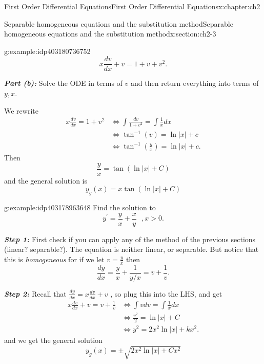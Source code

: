 \documentclass[oneside,10pt,]{book}
\newcommand{\alert}[1]{\textbf{\textit{#1}}}
\numberwithin{equation}{section}
\numberwithin{equation}{section}
\newcommand{\amp}{&}
\begin{document}
\begin{chapterptx}{First Order Differential Equations}{}{First Order Differential Equations}{}{}{x:chapter:ch2}
\begin{sectionptx}{Separable homogeneous equations and the substitution method}{}{Separable homogeneous equations and the substitution method}{}{}{x:section:ch2-3}
\begin{example}{}{g:example:idp403180736752}
\begin{equation*}
x\frac{dv}{dx}+v=1+v+v^{2}.
\end{equation*}
%
\par
\alert{Part (b):} Solve the ODE in terms of \(v\) and then return everything into terms of \(y,x\).%
\par
We rewrite%
\begin{align*}
x\frac{dv}{dx}=1+v^{2} \amp \iff\int\frac{dv}{1+v^{2}}=\int\frac{1}{x}dx\\
\amp \iff\tan^{-1}\left(v\right)=\ln\left|x\right|+c\\
\amp \iff\tan^{-1}\left(\frac{y}{x}\right)=\ln\left|x\right|+c.
\end{align*}
Then%
\begin{equation*}
\frac{y}{x}=\tan\left(\ln\left|x\right|+C\right)
\end{equation*}
and the general solution is%
\begin{equation*}
y_g(x)=x\tan\left(\ln\left|x\right|+C\right)
\end{equation*}
%
\end{example}
\begin{example}{}{g:example:idp403178963648}%
Find the solution to%
\begin{equation*}
y^{\prime}=\frac{y}{x}+\frac{x}{y}\,\,\,\,,x>0.
\end{equation*}
%
\par
\alert{Step 1:} First check if you can apply any of the method of the previous sections (linear? separable?). The equation is neither linear, or separable. But notice that this is \emph{homogeneous} for if we let \(v=\frac{y}{x}\) then%
\begin{equation*}
\frac{dy}{dx}=\frac{y}{x}+\frac{1}{y/x}=v+\frac{1}{v}.
\end{equation*}
%
\par
\alert{Step 2:} Recall that \(\frac{dy}{dx}=x\frac{dv}{dx}+v\) , so plug this into the LHS, and get%
\begin{align*}
x\frac{dv}{dx}+v=v+\frac{1}{v} \amp \iff\int vdv=\int\frac{1}{x}dx\\
\amp \iff\frac{v^{2}}{2}=\ln\left|x\right|+C\\
\amp \iff y^{2}=2x^{2}\ln\left|x\right|+kx^{2}.
\end{align*}
and we get the general solution%
\begin{equation*}
y_g(x)=\pm\sqrt{2x^{2}\ln\left|x\right|+Cx^{2}}
\end{equation*}
%
\begin{sageinput}

\end{sageinput}
\end{example}
\end{sectionptx}
\end{chapterptx}
\end{document}
